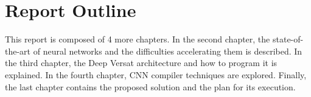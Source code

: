 



\section{Report Outline}
\label{reportoutline}

This report is composed of 4 more chapters. In the second chapter, the
state-of-the-art of neural networks and the difficulties accelerating them is
described. In the third chapter, the Deep Versat architecture and how to program
it is explained. In the fourth chapter, CNN compiler techniques are
explored. Finally, the last chapter contains the proposed solution and the plan
for its execution.


